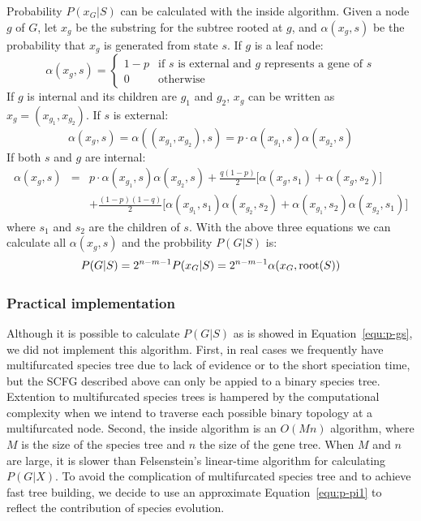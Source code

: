 \documentclass[pdftex,10pt]{article}
\begin{document}
Probability $P(x_G|S)$ can be calculated with the inside
algorithm. Given a node $g$ of $G$, let $x_g$ be the substring for the
subtree rooted at $g$, and $\alpha(x_g,s)$ be the probability that $x_g$
is generated from state $s$. If $g$ is a leaf node:
\begin{equation*}
  \alpha(x_g,s)=\left\{\begin{array}{ll} 1-p & \mbox{if $s$ is external and $g$ represents a gene of $s$} \\
    0 & \mbox{otherwise}\end{array}
  \right.
\end{equation*}
If $g$ is internal and its children are $g_1$ and $g_2$, $x_g$ can be
written as $x_g=(x_{g_1},x_{g_2})$. If $s$ is external:
\begin{equation*}
  \alpha(x_g,s)=\alpha((x_{g_1},x_{g_2}),s)=p\cdot\alpha(x_{g_1},s)\alpha(x_{g_2},s)
\end{equation*}
If both $s$ and $g$ are internal:
\begin{eqnarray*}
  \alpha(x_g,s)&=&p\cdot\alpha(x_{g_1},s)\alpha(x_{g_2},s)
  +\frac{q(1-p)}{2}\big[\alpha(x_g,s_1)+\alpha(x_g,s_2)\big]\\
  &&+\frac{(1-p)(1-q)}{2}\big[\alpha(x_{g_1},s_1)\alpha(x_{g_2},s_2)
  +\alpha(x_{g_1},s_2)\alpha(x_{g_2},s_1)\big]
\end{eqnarray*}
where $s_1$ and $s_2$ are the children of $s$. With the above three
equations we can calculate all $\alpha(x_g,s)$ and the probbility
$P(G|S)$ is:
\begin{equation}\label{equ:p-gs}
  P(G|S)=2^{n-m-1}P(x_G|S)=2^{n-m-1}\alpha(x_G,{\rm root}(S))
\end{equation}

\subsubsection{Practical implementation}

Although it is possible to calculate $P(G|S)$ as is showed in
Equation~\ref{equ:p-gs}, we did not implement this algorithm. First, in
real cases we frequently have multifurcated species tree due to lack of
evidence or to the short speciation time, but the SCFG described above
can only be appied to a binary species tree. Extention to multifurcated
species trees is hampered by the computational complexity when we intend
to traverse each possible binary topology at a multifurcated
node. Second, the inside algorithm is an $O(Mn)$ algorithm, where $M$ is
the size of the species tree and $n$ the size of the gene tree. When $M$
and $n$ are large, it is slower than Felsenstein's linear-time algorithm
for calculating $P(G|X)$. To avoid the complication of multifurcated
species tree and to achieve fast tree building, we decide to use an
approximate Equation~\ref{equ:p-pi1} to reflect the contribution of
species evolution.
\end{document}
